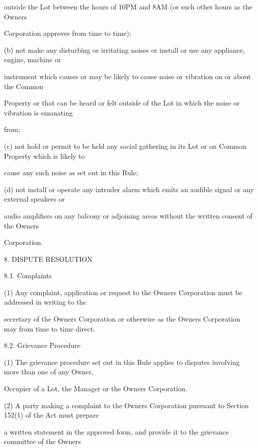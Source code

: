 \documentclass{article}
\begin{document}
{\fontsize{10.02}{1}outside the Lot between the hours of 10PM and 8AM (or such other hours as the Owners }

{\fontsize{10.02}{1}Corporation approves from time to time); }

{\fontsize{9.962}{1}(b) not make any disturbing or irritating noises or install or use any appliance, engine, machine or }

{\fontsize{10.02}{1}instrument which causes or may be likely to cause noise or vibration on or about the Common }

{\fontsize{10.02}{1}Property or that can be heard or felt outside of the Lot in which the noise or vibration is emanating }

{\fontsize{10.02}{1}from; }

{\fontsize{9.962}{1}(c) not hold or permit to be held any social gathering in its Lot or on Common Property which is likely to }

{\fontsize{10.02}{1}cause any such noise as set out in this Rule; }

{\fontsize{9.962}{1}(d) not install or operate any intruder alarm which emits an audible signal or any external speakers or }

{\fontsize{10.02}{1}audio amplifiers on any balcony or adjoining areas without the written consent of the Owners }

{\fontsize{10.02}{1}Corporation. }


{\fontsize{9.99}{1}8. DISPUTE RESOLUTION }

{\fontsize{9.99}{1}8.1. Complaints }

{\fontsize{9.962}{1}(1) Any complaint, application or request to the Owners Corporation must be addressed in writing to the }

{\fontsize{10.02}{1}secretary of the Owners Corporation or otherwise as the Owners Corporation may from time to time direct. }

{\fontsize{9.99}{1}8.2. Grievance Procedure }

{\fontsize{9.962}{1}(1) The grievance procedure set out in this Rule applies to disputes involving more than one of any Owner, }

{\fontsize{10.02}{1}Occupier of a Lot, the Manager or the Owners Corporation. }

{\fontsize{9.962}{1}(2) A party making a complaint to the Owners Corporation pursuant to Section 152(1) of the Act must prepare }

{\fontsize{10.02}{1}a written statement in the approved form, and provide it to the grievance committee of the Owners }
\end{document}
